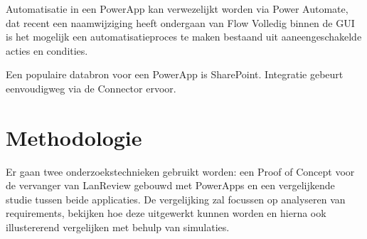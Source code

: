 Automatisatie in een PowerApp kan verwezelijkt worden via Power Automate, dat recent een naamwijziging heeft ondergaan van Flow \parencite{Weare2019} Volledig binnen de GUI is het mogelijk een automatisatieproces te maken bestaand uit aaneengeschakelde acties en condities.

Een populaire databron voor een PowerApp is SharePoint. Integratie gebeurt eenvoudigweg via de Connector ervoor. \parencite{Owen2019a}


\section{Methodologie}
\label{sec:methodologie}

Er gaan twee onderzoekstechnieken gebruikt worden: een Proof of Concept voor de vervanger van LanReview gebouwd met PowerApps en een vergelijkende studie tussen beide applicaties. De vergelijking zal focussen op analyseren van requirements, bekijken hoe deze uitgewerkt kunnen worden en hierna ook illustererend vergelijken met behulp van simulaties.

\vspace{5mm}


